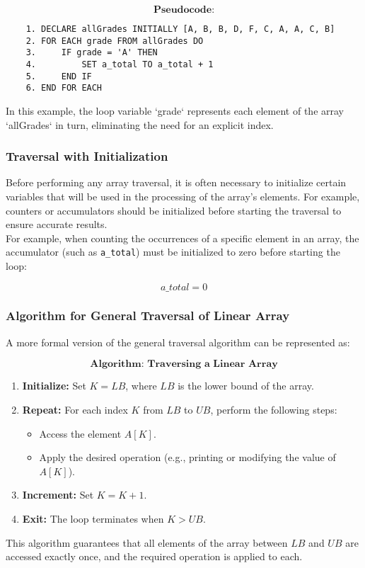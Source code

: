 \documentclass[12pt, oneside]{book}
\begin{document}
\[
\textbf{Pseudocode:}
\]
\begin{verbatim}
	1. DECLARE allGrades INITIALLY [A, B, B, D, F, C, A, A, C, B]
	2. FOR EACH grade FROM allGrades DO
	3.     IF grade = 'A' THEN
	4.         SET a_total TO a_total + 1
	5.     END IF
	6. END FOR EACH
\end{verbatim}
In this example, the loop variable `grade` represents each element of the array `allGrades` in turn, eliminating the need for an explicit index.

\subsubsection{Traversal with Initialization}
Before performing any array traversal, it is often necessary to initialize certain variables that will be used in the processing of the array's elements. For example, counters or accumulators should be initialized before starting the traversal to ensure accurate results.\\For example, when counting the occurrences of a specific element in an array, the accumulator (such as \texttt{a\_total}) must be initialized to zero before starting the loop:

\[
a\_total = 0
\]
  
\subsubsection{Algorithm for General Traversal of Linear Array}
A more formal version of the general traversal algorithm can be represented as:

\[
\textbf{Algorithm: Traversing a Linear Array}
\]
\begin{enumerate}
	\item \textbf{Initialize:} Set \( K = LB \), where \( LB \) is the lower bound of the array.
	\item \textbf{Repeat:} For each index \( K \) from \( LB \) to \( UB \), perform the following steps:
	\begin{itemize}
		\item Access the element \( A[K] \).
		\item Apply the desired operation (e.g., printing or modifying the value of \( A[K] \)).
	\end{itemize}
	\item \textbf{Increment:} Set \( K = K + 1 \).
	\item \textbf{Exit:} The loop terminates when \( K > UB \).
\end{enumerate}
This algorithm guarantees that all elements of the array between \( LB \) and \( UB \) are accessed exactly once, and the required operation is applied to each.
\end{document}
